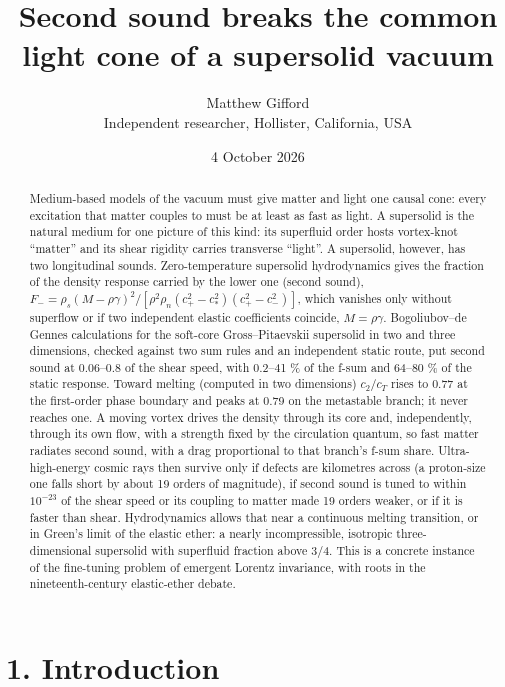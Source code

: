 \documentclass[
  11pt,
]{article}
\title{Second sound breaks the common light cone of a supersolid vacuum}
\author{Matthew Gifford\\[2pt]{\normalsize Independent researcher, Hollister, California, USA}}
\date{4 October 2026}
\begin{document}
\maketitle
\begin{abstract}
Medium-based models of the vacuum must give matter and light one causal
cone: every excitation that matter couples to must be at least as fast
as light. A supersolid is the natural medium for one picture of this
kind: its superfluid order hosts vortex-knot ``matter'' and its shear
rigidity carries transverse ``light''. A supersolid, however, has two
longitudinal sounds. Zero-temperature supersolid hydrodynamics gives the
fraction of the density response carried by the lower one (second
sound),
\(F_- = \rho_s (M-\rho\gamma)^2/[\rho^2\rho_n (c_+^2-c_*^2)(c_+^2-c_-^2)]\),
which vanishes only without superflow or if two independent elastic
coefficients coincide, \(M=\rho\gamma\). Bogoliubov--de Gennes
calculations for the soft-core Gross--Pitaevskii supersolid in two and
three dimensions, checked against two sum rules and an independent
static route, put second sound at 0.06--0.8 of the shear speed, with
0.2--41 \% of the f-sum and 64--80 \% of the static response. Toward
melting (computed in two dimensions) \(c_2/c_T\) rises to 0.77 at the
first-order phase boundary and peaks at 0.79 on the metastable branch;
it never reaches one. A moving vortex drives the density through its
core and, independently, through its own flow, with a strength fixed by
the circulation quantum, so fast matter radiates second sound, with a
drag proportional to that branch's f-sum share. Ultra-high-energy cosmic
rays then survive only if defects are kilometres across (a proton-size
one falls short by about 19 orders of magnitude), if second sound is
tuned to within \(10^{-23}\) of the shear speed or its coupling to
matter made 19 orders weaker, or if it is faster than shear.
Hydrodynamics allows that near a continuous melting transition, or in
Green's limit of the elastic ether: a nearly incompressible, isotropic
three-dimensional supersolid with superfluid fraction above 3/4. This is
a concrete instance of the fine-tuning problem of emergent Lorentz
invariance, with roots in the nineteenth-century elastic-ether debate.
\end{abstract}

\hypertarget{introduction}{%
\section{1. Introduction}\label{introduction}}
\end{document}
